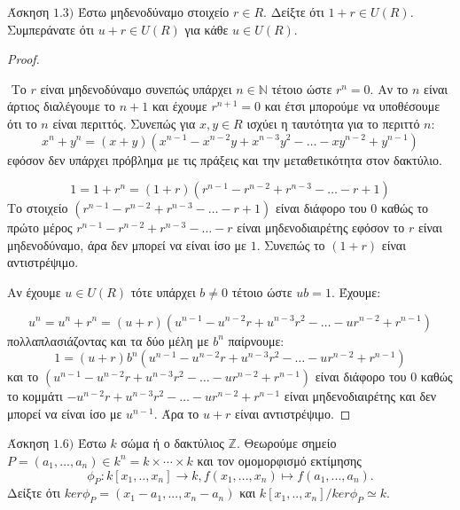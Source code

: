 \documentclass[oneside,a4paper]{article}
\newcommand{\Z}{\mathbb{Z}}
\begin{document}
\noindent Άσκηση $1.3)$
\quad Έστω μηδενοδύναμο στοιχείο $r \in R$. Δείξτε ότι $1 +r \in U(R)$. Συμπεράνατε ότι $u +r \in U(R)$  για κάθε $u \in U(R)$.
\begin{proof} $ $

	$ $\newline %
	Το $r$ είναι μηδενοδύναμο συνεπώς υπάρχει $n \in \mathbb{N}$ τέτοιο ώστε $r^n = 0$. Αν το $n$ είναι άρτιος διαλέγουμε το $n+1$ και έχουμε $r^{n+1} = 0$ και έτσι μπορούμε να υποθέσουμε ότι το $n$ είναι περιττός.
	Συνεπώς για $x,y \in R$ ισχύει η ταυτότητα για το περιττό $n$:
	$$x^n + y^n = (x+y)(x^{n-1} - x^{n-2}y + x^{n-3}y^2 - \ldots -xy^{n-2} + y^{n-1})$$
	εφόσον δεν υπάρχει πρόβλημα με τις πράξεις και την μεταθετικότητα στον δακτύλιο.

	$$1 = 1 + r^n = (1+r)(r^{n-1} - r^{n-2} + r^{n-3} - \ldots - r + 1)$$
	Το στοιχείο $(r^{n-1} - r^{n-2} + r^{n-3} - \ldots - r + 1)$ είναι διάφορο του $0$ καθώς το πρώτο μέρος $r^{n-1} - r^{n-2} + r^{n-3} - \ldots - r$ είναι μηδενοδιαιρέτης εφόσον το $r$ είναι μηδενοδύναμο, άρα δεν μπορεί να είναι ίσο με $1$.
	Συνεπώς το $(1+r)$ είναι αντιστρέψιμο.

	Αν έχουμε $u \in U(R)$ τότε υπάρχει $b\neq 0$ τέτοιο ώστε $ub=1$. Έχουμε:

	$$u^n = u^n + r^n  = (u+r)(u^{n-1} - u^{n-2}r + u^{n-3}r^2 - \ldots - ur^{n-2} + r^{n-1})$$
	πολλαπλασιάζοντας και τα δύο μέλη με $b^n$ παίρνουμε:
	$$1 = (u+r)b^n(u^{n-1} - u^{n-2}r + u^{n-3}r^2 - \ldots - ur^{n-2} + r^{n-1})$$
	και το $(u^{n-1} - u^{n-2}r + u^{n-3}r^2 - \ldots - ur^{n-2} + r^{n-1})$ είναι διάφορο του $0$ καθώς το κομμάτι $- u^{n-2}r + u^{n-3}r^2 - \ldots - ur^{n-2} + r^{n-1}$ είναι μηδενοδιαιρέτης και δεν μπορεί να είναι ίσο με $u^{n-1}$. Άρα το $u+r$ είναι αντιστρέψιμο.
\end{proof}

\pagebreak

\noindent Άσκηση $1.6)$
\quad Έστω $k$ σώμα ή ο δακτύλιος $\Z$. Θεωρούμε σημείο $P=(a_1,...,a_n) \in k^n=k \times \cdots \times k$ και τον ομομορφισμό εκτίμησης $$\phi_P: k[x_1,..,x_n] \rightarrow k, f(x_1,...,x_n) \mapsto f(a_1,...,a_n).$$ Δείξτε ότι $ker\phi_P=(x_1-a_1,...,x_n-a_n)$ και $k[x_1,..,x_n]/ker\phi_P \simeq k. $
\end{document}
